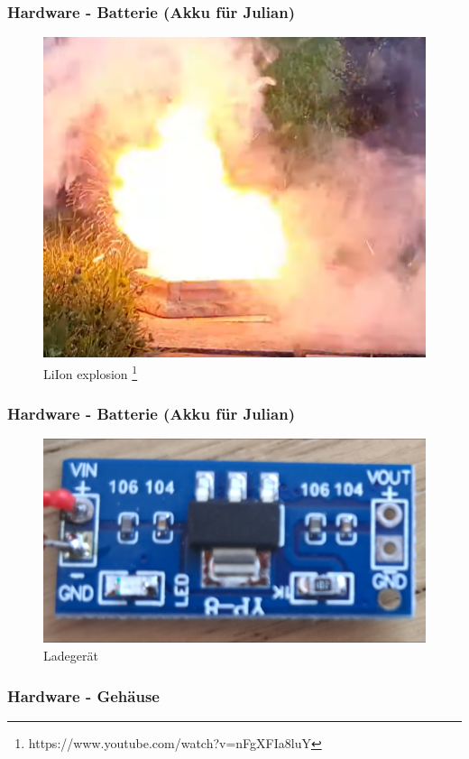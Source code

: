 \documentclass{beamer}
\begin{document}
\begin{frame}
    \frametitle{Hardware - Batterie (Akku für Julian)}
    \begin{figure}[h!]
        \includegraphics[width=0.75\linewidth]{LiPo.png}
        \caption{LiIon explosion \footnote{https://www.youtube.com/watch?v=nFgXFIa8luY}}
    \end{figure}
\end{frame}

\begin{frame}
    \frametitle{Hardware - Batterie (Akku für Julian)}
    \begin{figure}[h!]
        \includegraphics[width=0.75\linewidth]{Charger.png}
        \caption{Ladegerät}
    \end{figure}
\end{frame}

\begin{frame}
    \frametitle{Hardware - Gehäuse}
    
\end{frame}
\end{document}
